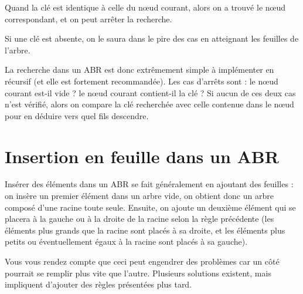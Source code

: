 \documentclass[11pt,a4paper]{article}
\begin{document}
\clearpage


Quand la clé est identique à celle du nœud courant, alors on a trouvé le nœud correspondant, et on peut arrêter la recherche.

Si une clé est absente, on le saura dans le pire des cas en atteignant les feuilles de l'arbre.

\medskip

La recherche dans un ABR est donc extrêmement simple à implémenter en récursif (et elle est fortement recommandée).
Les cas d'arrêts sont : le nœud courant est-il vide ? le nœud courant contient-il la clé ?
Si aucun de ces deux cas n'est vérifié, alors on compare la clé recherchée avec celle contenue dans le nœud pour en déduire vers quel fils descendre.





\section{Insertion en feuille dans un ABR}

Insérer des éléments dans un ABR se fait généralement en ajoutant des feuilles : on insère un premier élément dans un arbre vide, on obtient donc un arbre composé d'une racine toute seule.
Ensuite, on ajoute un deuxième élément qui se placera à la gauche ou à la droite de la racine selon la règle précédente (les éléments plus grands que la racine sont placés à sa droite, et les éléments plus petits ou éventuellement égaux à la racine sont placés à sa gauche).

\medskip

Vous vous rendez compte que ceci peut engendrer des problèmes car un côté pourrait se remplir plus vite que l'autre.
Plusieurs solutions existent, mais impliquent d'ajouter des règles présentées plus tard.


\end{document}
